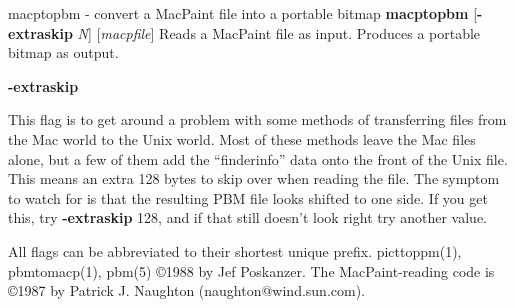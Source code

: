 \newpage
%

macptopbm - convert a MacPaint file into a portable bitmap
{\bf macptopbm}
{\rm [}{\bf -extraskip}
{\it N}{\rm ]}
{\rm [}{\it macpfile}{\rm ]}
Reads a MacPaint file as input.
Produces a portable bitmap as output.
\begin{TPlist}{{\bf -extraskip}}
\item[{{\bf -extraskip}}]
This flag is to get around a problem with some methods
of transferring files from the Mac world to the Unix world.
Most of these methods leave the Mac files alone, but a few of
them add the ``finderinfo'' data onto the front of the Unix file.
This means an extra 128 bytes to skip over when reading the file.
The symptom to watch for is that the resulting PBM file looks shifted
to one side.
If you get this, try
{\bf -extraskip}
128, and if that still doesn't look right try another value.
\end{TPlist}

\par
All flags can be abbreviated to their shortest unique prefix.
picttoppm(1), pbmtomacp(1), pbm(5)
\copyright 1988 by Jef Poskanzer.
The MacPaint-reading code is \copyright 1987 by Patrick J. Naughton
(naughton@wind.sun.com).
%
 
%

